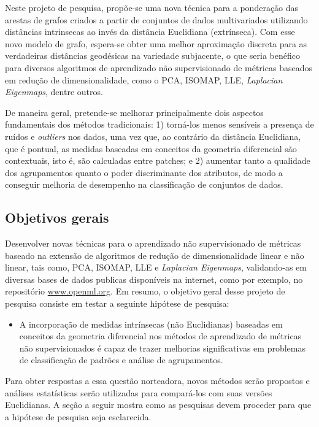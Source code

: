 \documentclass[a4paper,12pt]{article}
\begin{document}
Neste projeto de pesquisa, propõe-se uma nova técnica para a ponderação das arestas de grafos criados a partir de conjuntos de dados multivariados utilizando distâncias intrinsecas ao invés da distância Euclidiana (extrínseca). Com esse novo modelo de grafo, espera-se obter uma melhor aproximação discreta para as verdadeiras distâncias geodésicas na variedade subjacente, o que seria benéfico para diversos algoritmos de aprendizado não supervisionado de métricas baseados em redução de dimensionalidade, como o PCA, ISOMAP, LLE, \emph{Laplacian Eigenmaps}, dentre outros.

De maneira geral, pretende-se melhorar principalmente dois aspectos fundamentais dos métodos tradicionais: 1) torná-los menos sensíveis a presença de ruídos e \emph{outliers} nos dados, uma vez que, ao contrário da distância Euclidiana, que é pontual, as medidas baseadas em conceitos da geometria diferencial são contextuais, isto é, são calculadas entre patches; e 2) aumentar tanto a qualidade dos agrupamentos quanto o poder discriminante dos atributos, de modo a conseguir melhoria de desempenho na classificação de conjuntos de dados. 

\subsection{Objetivos gerais}

Desenvolver novas técnicas para o aprendizado não supervisionado de métricas baseado na extensão de algoritmos de redução de dimensionalidade linear e não linear, tais como, PCA, ISOMAP, LLE e \emph{Laplacian Eigenmaps}, validando-as em diversas bases de dados publicas disponíveis na internet, como por exemplo, no repositório \url{www.openml.org}. Em resumo, o objetivo geral desse projeto de pesquisa consiste em testar a seguinte hipótese de pesquisa:

\begin{itemize}
	\item A incorporação de medidas intrínsecas (não Euclidianas) baseadas em conceitos da geometria diferencial nos métodos de aprendizado de métricas não supervisionados é capaz de trazer melhorias significativas em problemas de classificação de padrões e análise de agrupamentos.
\end{itemize}

Para obter respostas a essa questão norteadora, novos métodos serão propostos e análises estatísticas serão utilizadas para compará-los com suas versões Euclidianas. A seção a seguir mostra como as pesquisas devem proceder para que a hipótese de pesquisa seja esclarecida. 
\end{document}
